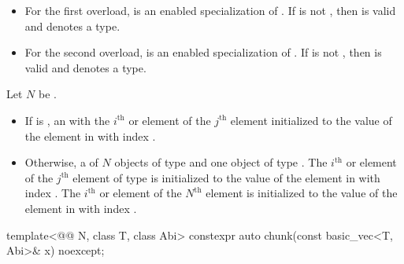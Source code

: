 \begin{itemdescr}
\pnum
\constraints
\begin{itemize}
 \item
   For the first overload,
    is an enabled specialization of .
   If 
   is not , then
    is valid and denotes a type.

 \item
   For the second overload,
    is an enabled specialization of .
   If 
   is not , then
    is valid and denotes a type.
\end{itemize}

\pnum
Let $N$ be .

\pnum
\returns
\begin{itemize}
 \item
   If  is , an  with the $i^\text{th}$  or 
   element of the $j^\text{th}$  element initialized to the value
   of the element in  with index .

 \item
   Otherwise, a  of $N$ objects of type  and one object
   of type .
   The $i^\text{th}$  or  element of
   the $j^\text{th}$  element of type  is initialized to
   the value of the element in  with index .
   The $i^\text{th}$  or  element of
   the $N^\text{th}$  element is initialized to the value of the
   element in  with index .
\end{itemize}
\end{itemdescr}

\begin{itemdecl}
template<@@ N, class T, class Abi>
  constexpr auto chunk(const basic_vec<T, Abi>& x) noexcept;
\end{itemdecl}

